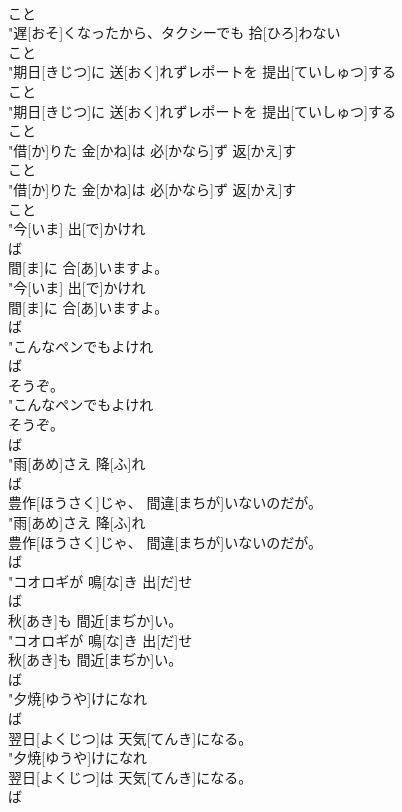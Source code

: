 \documentclass[8pt]{extreport}
\begin{document}
\begin{CJK}{UTF8}{min}
\\	こと
\\	"遅[おそ]くなったから、タクシーでも 拾[ひろ]わない
\\	こと
\\	"期日[きじつ]に 送[おく]れずレポートを 提出[ていしゅつ]する
\\	こと
\\	"期日[きじつ]に 送[おく]れずレポートを 提出[ていしゅつ]する
\\	こと
\\	"借[か]りた 金[かね]は 必[かなら]ず 返[かえ]す
\\	こと
\\	"借[か]りた 金[かね]は 必[かなら]ず 返[かえ]す
\\	こと
\\	"今[いま] 出[で]かけれ
\\	ば
\\	間[ま]に 合[あ]いますよ。
\\	"今[いま] 出[で]かけれ
\\	間[ま]に 合[あ]いますよ。
\\	ば
\\	"こんなペンでもよけれ
\\	ば
\\	そうぞ。
\\	"こんなペンでもよけれ
\\	そうぞ。
\\	ば
\\	"雨[あめ]さえ 降[ふ]れ
\\	ば
\\	豊作[ほうさく]じゃ、 間違[まちが]いないのだが。
\\	"雨[あめ]さえ 降[ふ]れ
\\	豊作[ほうさく]じゃ、 間違[まちが]いないのだが。
\\	ば
\\	"コオロギが 鳴[な]き 出[だ]せ
\\	ば
\\	秋[あき]も 間近[まぢか]い。
\\	"コオロギが 鳴[な]き 出[だ]せ
\\	秋[あき]も 間近[まぢか]い。
\\	ば
\\	"夕焼[ゆうや]けになれ
\\	ば
\\	翌日[よくじつ]は 天気[てんき]になる。
\\	"夕焼[ゆうや]けになれ
\\	翌日[よくじつ]は 天気[てんき]になる。
\\	ば

\end{CJK}
\end{document}
